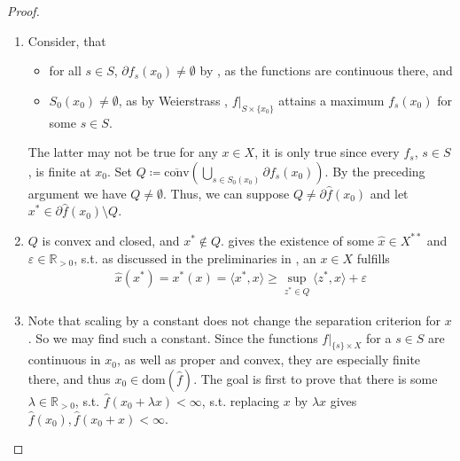 \documentclass[10pt, leqno]{amsart}
\theoremstyle{definition}
\theoremstyle{remark}
\newcommand{\draftcommentdone}{}
\begin{document}
\begin{proof}
\begin{enumerate}[label=(\roman*), wide]
            \begin{enumerate}[label=(\alph*), wide]
                \item \label{supremum_theorem_2_1} \draftcommentdone Consider, that
                \begin{itemize}[wide]
                    \item for all \(s \in S\), \(\partial f_s(x_0) \neq \emptyset\) by \cite[p. 199]{IoffeTihomirov}, as the functions are continuous there, and
                    \item \(S_0(x_0) \neq \emptyset\), as by Weierstrass \cite[p. 13]{IoffeTihomirov}, \(f|_{S \times \{x_0\}}\) attains a maximum \(f_s(x_0)\) for some \(s \in S\).
                \end{itemize}
                The latter may not be true for any \(x \in X\), it is only true since every \(f_s\), \(s \in S\), is finite at \(x_0\). Set \(Q \coloneqq \overline{\text{conv}}(\bigcup_{s \in S_0(x_0)} \partial f_s(x_0))\). By the preceding argument we have \(Q \neq \emptyset\). Thus, we can suppose \(Q \neq \partial \hat{f}(x_0)\) and let \(x^* \in \partial \hat{f}(x_0) \setminus Q\).
                \item \label{supremum_theorem_2_2} \draftcommentdone \(Q\) is convex and closed, and \(x^* \notin Q\).  gives the existence of some \(\hat{x} \in X^{**}\) and \(\varepsilon \in \mathbb{R}_{> 0}\), s.t. as discussed in the preliminaries in , an \(x \in X\) fulfills
                \begin{align}
                    \hat{x}(x^*) = x^*(x) = \langle x^*, x \rangle \geq \sup_{z^* \in Q} \langle z^*, x\rangle + \varepsilon
                \end{align}
                \item \label{supremum_theorem_2_3} \draftcommentdone Note that scaling by a constant does not change the separation criterion for \(x\). So we may find such a constant. Since the functions \(f|_{\{s\} \times X}\) for a \(s \in S\) are continuous in \(x_0\), as well as proper and convex, they are especially finite there, and thus \(x_0 \in \text{dom}(\hat{f})\). The goal is first to prove that there is some \(\lambda \in \mathbb{R}_{> 0}\), s.t. \(\hat{f}(x_0+\lambda x) < \infty\), s.t. replacing \(x\) by \(\lambda x\) gives \(\hat{f}(x_0), \hat{f}(x_0+x) < \infty\).
                

\end{enumerate}
\end{enumerate}
\end{proof}
\end{document}

